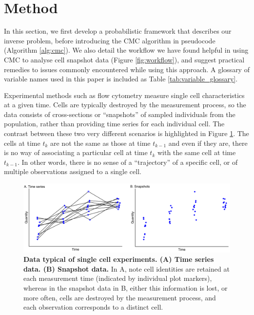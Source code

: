 \section{Method}\label{sec:method}
In this section, we first develop a probabilistic framework that describes our inverse problem, before introducing the CMC algorithm in pseudocode (Algorithm \ref{alg:cmc}). We also detail the workflow we have found helpful in using CMC to analyse cell snapshot data (Figure \ref{fig:workflow}), and suggest practical remedies to issues commonly encountered while using this approach. A glossary of variable names used in this paper is included as Table \ref{tab:variable_glossary}.

Experimental methods such as flow cytometry measure single cell characteristics at a given time. Cells are typically destroyed by the measurement process, so the data consists of cross-sections or ``snapshots'' of sampled individuals from the population, rather than providing time series for each individual cell. The contrast between these two very different scenarios is highlighted in Figure \ref{fig:time_series_v_snapshots}. The cells at time $t_k$ are not the same as those at time $t_{k-1}$ and even if they are, there is no way of associating a particular cell at time $t_k$ with the same cell at time $t_{k-1}$. In other words, there is no sense of a ``trajectory'' of a specific cell, or of multiple observations assigned to a single cell.


\begin{figure}[H]
  \centerline{\includegraphics[width=\textwidth]{../figures/time_series_v_snapshots.pdf}}
  \caption{\textbf{Data typical of single cell experiments. (A) Time series data. (B) Snapshot data.} In A, note cell identities are retained at each measurement time (indicated by individual plot markers), whereas in the snapshot data in B, either this information is lost, or more often, cells are destroyed by the measurement process, and each observation corresponds to a distinct cell.}
  \label{fig:time_series_v_snapshots}
\end{figure}

